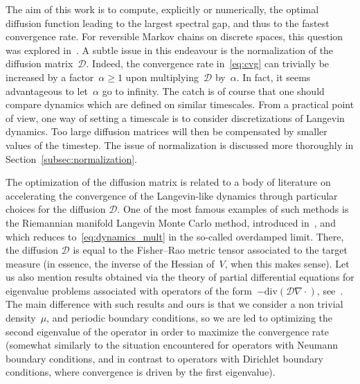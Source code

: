 \documentclass{article}
\renewcommand{\geq}{\geqslant}
\newcommand{\Diff}{\mathcal{D}}
\begin{document}
The aim of this work is to compute, explicitly or numerically, the optimal diffusion function leading to the largest spectral gap, and thus to the fastest convergence rate. For reversible Markov chains on discrete spaces, this question was explored in~\cite{Boyd_fastMC}. A subtle issue in this endeavour is the normalization of the diffusion matrix~$\Diff$. Indeed, the convergence rate in~\eqref{eq:cvg} can trivially be increased by a factor~$\alpha\geq 1$ upon multiplying~$\Diff$ by~$\alpha$. In fact, it seems advantageous to let~$\alpha$ go to infinity. The catch is of course that one should compare dynamics which are defined on similar timescales. From a practical point of view, one way of setting a timescale is to consider discretizations of Langevin dynamics. Too large diffusion matrices will then be compensated by smaller values of the timestep. The issue of normalization is discussed more thoroughly in Section~\ref{subsec:normalization}.

The optimization of the diffusion matrix is related to a body of literature on accelerating the convergence of the Langevin-like dynamics through particular choices for the diffusion $\Diff$. One of the most famous examples of such methods is the Riemannian manifold Langevin Monte Carlo method, introduced in~\cite{Girolami_RiemannMC}, and which reduces to~\eqref{eq:dynamics_mult} in the so-called overdamped limit. There, the diffusion $\Diff$ is equal to the Fisher--Rao metric tensor associated to the target measure (in essence, the inverse of the Hessian of~$V$, when this makes sense). Let us also mention results obtained via the theory of partial differential equations for eigenvalue problems associated with operators of the form~$-\mathrm{div}(\Diff \nabla \cdot)$, see~\cite[Chapter~10]{Henrot}. The main difference with such results and ours is that we consider a non trivial density~$\mu$, and periodic boundary conditions, so we are led to optimizing the second eigenvalue of the operator in order to maximize the convergence rate (somewhat similarly to the situation encountered for operators with Neumann boundary conditions, and in contrast to operators with Dirichlet boundary conditions, where convergence is driven by the first eigenvalue).   
\end{document}
